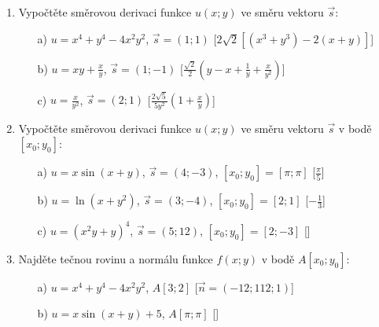 \begin{enumerate}
\item Vypočtěte směrovou derivaci funkce $u(x;y)$ ve směru vektoru $\vec{s}$:
\begin{enumerate}
\item[a)]{$u=x^4+y^4-4x^2y^2$}, $\vec{s}=(1;1)$
\hspace{\fill}[$2\sqrt{2}[(x^3+y^3) - 2(x+y)]$]
\item[b)]{$u=xy+\frac{x}{y}$}, $\vec{s}=(1;-1)$
\hspace{\fill}[$\frac{\sqrt{2}}{2} (y-x+\frac{1}{y}+\frac{x}{y^2})$]
\item[c)]{$u=\frac{x}{y^2}$}, $\vec{s}=(2;1)$
\hspace{\fill}[$\frac{2\sqrt{5}}{5y^2}(1+\frac{x}{y})$]
\end{enumerate}

\item Vypočtěte směrovou derivaci funkce $u(x;y)$ ve směru vektoru $\vec{s}$ v bodě $[x_0;y_0]$:
\begin{enumerate}
\item[a)]{$u=x\sin(x+y)$}, $\vec{s}=(4;-3)$, $[x_0;y_0]=[\pi;\pi]$
\hspace{\fill}[$\frac{\pi}{5}$]
\item[b)]{$u=\ln(x+y^2)$}, $\vec{s}=(3;-4)$, $[x_0;y_0]=[2;1]$
\hspace{\fill}[$-\frac{1}{3}$]
\item[c)]{$u=(x^2y+y)^4$}, $\vec{s}=(5;12)$, $[x_0;y_0]=[2;-3]$
\hspace{\fill}[]
\end{enumerate}

\item Najděte tečnou rovinu a normálu funkce $f(x;y)$ v bodě $A[x_0;y_0]$:
\begin{enumerate}
\item[a)]{$u=x^4+y^4-4x^2y^2$}, $A[3;2]$
\hspace{\fill}[$\vec{n}=(-12;112;1)$]
\item[b)]{$u=x\sin(x+y)+5$}, $A[\pi;\pi]$
\hspace{\fill}[]
\end{enumerate}


\end{enumerate}
